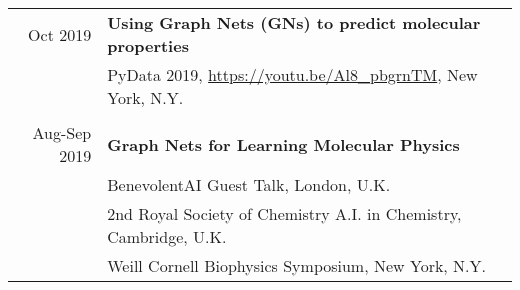 \begin{tabular}{rl}
Oct 2019 & \textbf{Using Graph Nets (GNs) to predict molecular properties}\\
         & PyData 2019, \url{https://youtu.be/Al8_pbgrnTM}, New York, N.Y.\\\\

Aug-Sep 2019 & \textbf{Graph Nets for Learning Molecular Physics} \\
         & BenevolentAI Guest Talk, London, U.K.\\
         & 2nd Royal Society of Chemistry A.I. in Chemistry, Cambridge, U.K.\\
         & Weill Cornell Biophysics Symposium, New York, N.Y.\\

\end{tabular}



